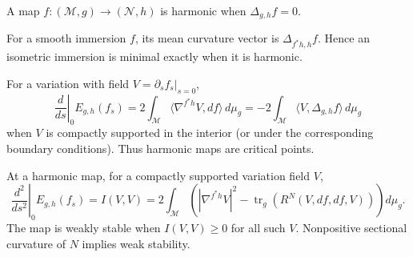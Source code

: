 \begin{definition}
\label{def:chow-iv-k12-harmonic-map}


A map $f:(\mathcal M,g)\to(\mathcal N,h)$ is harmonic when
$\Delta_{g,h}f=0$.
\end{definition}

\begin{example}
\label{ex:chow-iv-k13-minimal-immersion}


For a smooth immersion $f$, its mean curvature vector is
$\Delta_{f^*h,h}f$.  Hence an isometric immersion is minimal exactly when it
is harmonic.
\end{example}

\begin{lemma}
\label{lem:chow-iv-k14-first-variation}


For a variation with field $V=\partial_sf_s|_{s=0}$,
\[
\left.\frac{d}{ds}\right|_{0}E_{g,h}(f_s)=
2\int_{\mathcal M}\langle\nabla^{f^*h}V,df\rangle\,d\mu_g
=-2\int_{\mathcal M}\langle V,\Delta_{g,h}f\rangle\,d\mu_g
\]
when $V$ is compactly supported in the interior (or under the corresponding
boundary conditions).  Thus harmonic maps are critical points.
\end{lemma}

\begin{lemma}
\label{lem:chow-iv-k15-second-variation}


At a harmonic map, for a compactly supported variation field $V$,
\[
\left.\frac{d^2}{ds^2}\right|_0E_{g,h}(f_s)=I(V,V)
=2\int_{\mathcal M}\left(|\nabla^{f^*h}V|^2-
\operatorname{tr}_g(R^N(V,df,df,V))\right)d\mu_g.
\]
The map is weakly stable when $I(V,V)\ge0$ for all such $V$.  Nonpositive
sectional curvature of $N$ implies weak stability.
\end{lemma}

